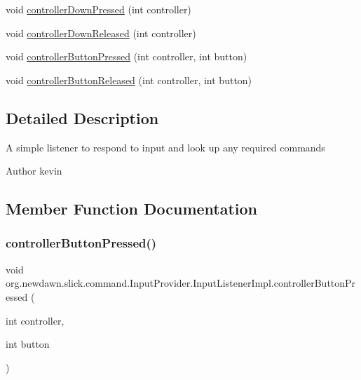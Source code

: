 \begin{DoxyCompactItemize}
\item 
void \mbox{\hyperlink{classorg_1_1newdawn_1_1slick_1_1command_1_1_input_provider_1_1_input_listener_impl_a80dbef3f0eaed865ae1ef23b406cea40}{controller\+Down\+Pressed}} (int controller)
\item 
void \mbox{\hyperlink{classorg_1_1newdawn_1_1slick_1_1command_1_1_input_provider_1_1_input_listener_impl_a088db9874120ee50128d286f0c2f4d87}{controller\+Down\+Released}} (int controller)
\item 
void \mbox{\hyperlink{classorg_1_1newdawn_1_1slick_1_1command_1_1_input_provider_1_1_input_listener_impl_a73f1147258038fc20b2a61aebc2096a3}{controller\+Button\+Pressed}} (int controller, int button)
\item 
void \mbox{\hyperlink{classorg_1_1newdawn_1_1slick_1_1command_1_1_input_provider_1_1_input_listener_impl_a32ba61e40693153639ad65623c4e9f4c}{controller\+Button\+Released}} (int controller, int button)
\end{DoxyCompactItemize}


\subsection{Detailed Description}
A simple listener to respond to input and look up any required commands

\begin{DoxyAuthor}{Author}
kevin 
\end{DoxyAuthor}


\subsection{Member Function Documentation}
\mbox{\label{classorg_1_1newdawn_1_1slick_1_1command_1_1_input_provider_1_1_input_listener_impl_a73f1147258038fc20b2a61aebc2096a3}} 
\subsubsection{\texorpdfstring{controller\+Button\+Pressed()}{controllerButtonPressed()}}
{\footnotesize\ttfamily void org.\+newdawn.\+slick.\+command.\+Input\+Provider.\+Input\+Listener\+Impl.\+controller\+Button\+Pressed (\begin{DoxyParamCaption}\item[{int}]{controller,  }\item[{int}]{button }\end{DoxyParamCaption})\hspace{0.3cm}{\ttfamily [inline]}}

